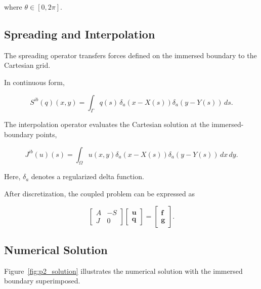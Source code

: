 \documentclass[11pt]{article}
\begin{document}
where $\theta\in[0,2\pi]$.

\subsection*{Spreading and Interpolation}

The spreading operator transfers forces defined on the
immersed boundary to the Cartesian grid.

In continuous form,

\begin{equation}
    S^{ib}(q)(x,y)
    =
    \int_{\Gamma}
    q(s)\,
    \delta_a(x-X(s))
    \delta_a(y-Y(s))
    \,ds.
\end{equation}

The interpolation operator evaluates the Cartesian solution
at the immersed-boundary points,

\begin{equation}
    J^{ib}(u)(s)
    =
    \int_\Omega
    u(x,y)
    \delta_a(x-X(s))
    \delta_a(y-Y(s))
    \,dx\,dy.
\end{equation}

Here, $\delta_a$ denotes a regularized delta function.

After discretization, the coupled problem can be expressed as

\begin{equation}
    \begin{bmatrix}
        A & -S\\
        J & 0
    \end{bmatrix}
    \begin{bmatrix}
        \mathbf{u}\\
        \mathbf{q}
    \end{bmatrix}
    =
    \begin{bmatrix}
        \mathbf{f}\\
        \mathbf{g}
    \end{bmatrix}.
\end{equation}

\subsection*{Numerical Solution}

Figure~\ref{fig:p2_solution} illustrates the numerical
solution with the immersed boundary superimposed.
\end{document}
